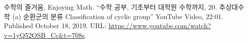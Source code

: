 \documentclass[11pt,openany]{article}
\begin{document}
\newpage

\newpage
{}

\vfill
\begin{thebibliography}{9}
	수학의 즐거움, Enjoying Math. ``수학 공부, 기초부터 대학원 수학까지, 20. 추상대수학 (a) 순환군의 분류 Classification of cyclic group'' YouTube Video, 22:01. Published 
	October 18, 2019. URL: \url{https://www.youtube.com/watch?v=1yQ52OSB_Cc&t=708s}.
\end{thebibliography}
\end{document}
